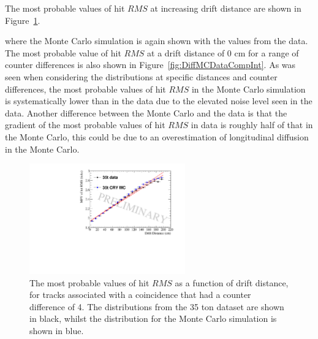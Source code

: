 The most probable values of hit $RMS$ at increasing drift distance are shown in Figure~\ref{fig:DiffMCDataCompFit}. 

where the Monte Carlo simulation is again shown with the values from the data. The most probable value of hit $RMS$ at a drift distance of 0 cm for a range of counter differences is also shown in Figure~\ref{fig:DiffMCDataCompInt}. As was seen when considering the distributions at specific distances and counter differences, the most probable values of hit $RMS$ in the Monte Carlo simulation is systematically lower than in the data due to the elevated noise level seen in the data. Another difference between the Monte Carlo and the data is that the gradient of the most probable values of hit $RMS$ in data is roughly half of that in the Monte Carlo, this could be due to an overestimation of longitudinal diffusion in the Monte Carlo. \\

\begin{figure}[h!]
  \centering
  \includegraphics[width=0.6\textwidth]{CounterDiff4_Overlay}
  \caption[The drift distance dependence of diffusion in the 35 ton dataset and Monte Carlo for coincidences with a counter difference of 4]
          {The most probable values of hit $RMS$ as a function of drift distance, for tracks associated with a coincidence that had a counter difference of 4. The distributions from the 35 ton dataset are shown in black, whilst the distribution for the Monte Carlo simulation is shown in blue.}
  \label{fig:DiffMCDataCompFit}
\end{figure}

